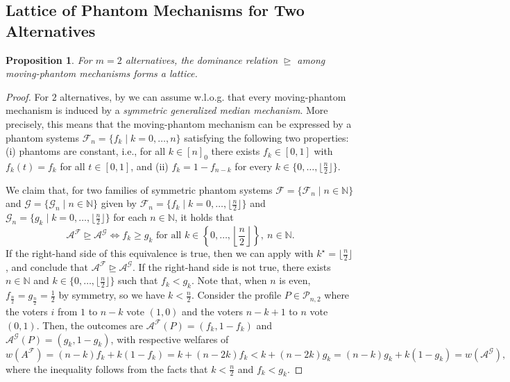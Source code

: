 \documentclass[11pt]{article}
\newcommand{\F}{\mathcal{F}}
\newcommand{\G}{\mathcal{G}}
\newcommand{\A}{\mathcal{A}}
\newcommand{\N}{\mathbb{N}}
\newtheorem{proposition}{Proposition}
\begin{document}
\subsection{Lattice of Phantom Mechanisms for Two Alternatives}\label{app:latticeTwoAlternatives}

\begin{proposition}
    For $m=2$ alternatives, the dominance relation $\trianglerighteq$ among moving-phantom mechanisms forms a lattice. 
\end{proposition}

\begin{proof}
    For $2$ alternatives, by \citet[][Theorem 5]{freeman2021truthful} we can assume w.l.o.g. that every moving-phantom mechanism is induced by a \emph{symmetric generalized median mechanism}. More precisely, this means that the moving-phantom mechanism can be expressed by a phantom systems $\F_n=\{ f_k\mid k=0,\ldots,n\}$ satisfying the following two properties: (i) phantoms are constant, i.e., for all $k \in [n]_0$ there exists $f_k \in [0,1]$ with $f_k(t) = f_k$ for all $t \in [0,1]$, and (ii) $f_k=1-f_{n-k}$ for every $k\in \big\{0,\ldots,\big\lfloor\frac{n}{2}\big\rfloor\big\}$. 

    We claim that, for two families of symmetric phantom systems $\F=\{\F_n\mid n\in \N\}$ and $\G=\{\G_n\mid n\in \N\}$ given by $\F_n=\big\{f_k\mid k=0,\ldots,\big\lfloor\frac{n}{2}\big\rfloor\big\}$ and $\G_n=\big\{g_k\mid k=0,\ldots,\big\lfloor\frac{n}{2}\big\rfloor\big\}$ for each $n\in \N$, it holds that
    \[
        \A^\F \trianglerighteq \A^\G \Longleftrightarrow f_k\geq g_k \text{ for all } k\in \left\{0,\ldots,\left\lfloor\frac{n}{2}\right\rfloor\right\},\ n\in \N.
    \]
    If the right-hand side of this equivalence is true, then we can apply  with $k^\star=\big\lfloor\frac{n}{2}\big\rfloor$, and conclude that $\A^\F \trianglerighteq \A^\G$.
    If the right-hand side is not true, there exists $n\in \N$ and $k\in \big\{0,\ldots,\big\lfloor\frac{n}{2}\big\rfloor\big\}$ such that $f_k<g_k$.
    Note that, when $n$ is even, $f_{\frac{n}{2}}=g_{\frac{n}{2}}=\frac{1}{2}$ by symmetry, so we have $k<\frac{n}{2}$.
    Consider the profile $P\in \mathcal{P}_{n,2}$ where the voters $i$ from $1$ to $n-k$ vote $(1,0)$ and the voters $n-k+1$ to $n$ vote $(0,1)$. 
    Then, the outcomes are $\A^\F(P)=(f_k,1-f_k)$ and $\A^\G(P)=(g_k,1-g_k)$, with respective welfares of
    \[
        w(A^\F) = (n-k)f_k+k(1-f_k)=k+(n-2k)f_k < k+(n-2k)g_k = (n-k)g_k + k(1-g_k) = w(\A^\G),
    \]
    where the inequality follows from the facts that $k<\frac{n}{2}$ and $f_k<g_k$.
    

\end{proof}
\end{document}
